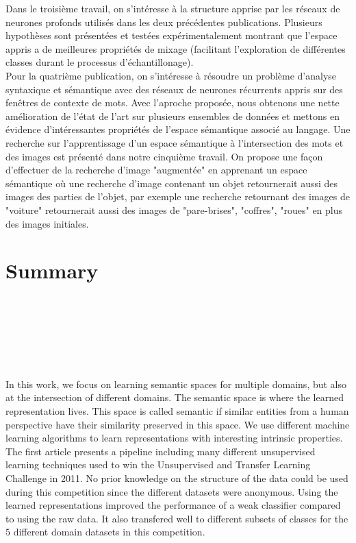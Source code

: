 \vspace{-0.2cm}
Dans le troisième travail, on s'intéresse à la structure apprise par les
réseaux de neurones profonds utilisés dans les deux précédentes publications.
Plusieurs hypothèses sont présentées et testées expérimentalement montrant que
l'espace appris a de meilleures propriétés de mixage (facilitant l'exploration de
différentes classes durant le processus d'échantillonage).
\\

\vspace{-0.2cm}
Pour la quatrième publication, on s'intéresse à résoudre un problème d'analyse
syntaxique et sémantique avec des réseaux de neurones récurrents appris sur des
fenêtres de contexte de mots. Avec l'aproche proposée, nous obtenons une nette amélioration de l'état de
l'art sur plusieurs ensembles de données et mettons en évidence d'intéressantes propriétés de
l'espace sémantique associé au langage.  Une recherche sur l'apprentissage d'un
espace sémantique à l'intersection des mots et des images est présenté dans
notre cinquième travail. On propose une façon d'effectuer de la recherche
d'image "augmentée" en apprenant un espace sémantique où une recherche d'image
contenant un objet retournerait aussi des images des parties de l'objet, par
exemple une recherche retournant des images de  "voiture" retournerait aussi
des images de "pare-brises", "coffres", "roues" en plus des images initiales.
 
\chapter*{Summary\\~~~~~~~~\\~~~~~~~~~~~\\~~~~~~~~~~}

\vspace{-3cm}

In this work, we focus on learning semantic spaces for multiple domains, but
also at the intersection of different domains. The semantic space is where the
learned representation lives. This space is called semantic if similar
entities from a human perspective have their similarity preserved in this
space.  We use different machine learning algorithms to learn representations
with interesting intrinsic properties. 
\\

\vspace{-0.2cm} The first article presents a pipeline including many different
unsupervised learning techniques used to win the Unsupervised and Transfer
Learning Challenge in 2011. No prior knowledge on the structure of the data
could be used during this competition since the different datasets were
anonymous. Using the learned representations improved the performance of a weak
classifier compared to using the raw data. It also transfered well to different
subsets of classes for the $5$ different domain datasets in this competition.

